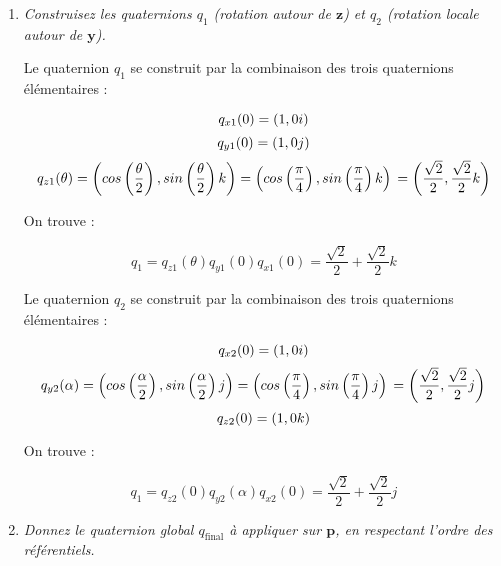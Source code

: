 \documentclass[a4paper,12pt]{article}
\begin{document}
\begin{enumerate}
          \item \emph{Construisez les quaternions \( q_1 \) (rotation autour de \( \mathbf{z} \)) et \( q_2 \) (rotation locale autour de \( \mathbf{y} \)).}

            Le quaternion \( q_1 \) se construit par la combinaison des trois quaternions élémentaires :

            \[
              q_{x1}(0) = (1, 0i) \newline
            \]
            \[
              q_{y1}(0) = (1, 0j) \newline  
            \]
            \[ 
              q_{z1}(\theta) 
              = \left(cos \left( \frac{\theta}{2} \right), sin \left(\frac{\theta}{2} \right)k\right) 
              = \left(cos \left( \frac{\pi}{4} \right), sin \left(\frac{\pi}{4} \right)k\right) \newline 
              = \left( \frac{\sqrt{2}}{2}, \frac{\sqrt{2}}{2}k \right) 
            \]

            On trouve :

            \[
              q_1 = q_{z1}(\theta) q_{y1}(0) q_{x1}(0) = \boxed{\frac{\sqrt{2}}{2} + \frac{\sqrt{2}}{2}k}
            \]

            Le quaternion \( q_2 \) se construit par la combinaison des trois quaternions élémentaires :

            \[
              q_{x2}(0) = (1, 0i) \newline
            \]
            \[ 
              q_{y2}(\alpha) 
              = \left(cos \left( \frac{\alpha}{2} \right), sin \left(\frac{\alpha}{2} \right)j\right) 
              = \left(cos \left( \frac{\pi}{4} \right), sin \left(\frac{\pi}{4} \right)j\right) \newline 
              = \left( \frac{\sqrt{2}}{2}, \frac{\sqrt{2}}{2}j \right) 
            \]
            \[
              q_{z2}(0) = (1, 0k) \newline  
            \]

            On trouve :

            \[
              q_1 = q_{z2}(0) q_{y2}(\alpha) q_{x2}(0) = \boxed{\frac{\sqrt{2}}{2} + \frac{\sqrt{2}}{2}j}
            \]

          \newpage \item \emph{Donnez le quaternion global \( q_{\text{final}} \) à appliquer sur \( \mathbf{p} \), en respectant l’ordre des référentiels.} 


\end{enumerate}
\end{document}
